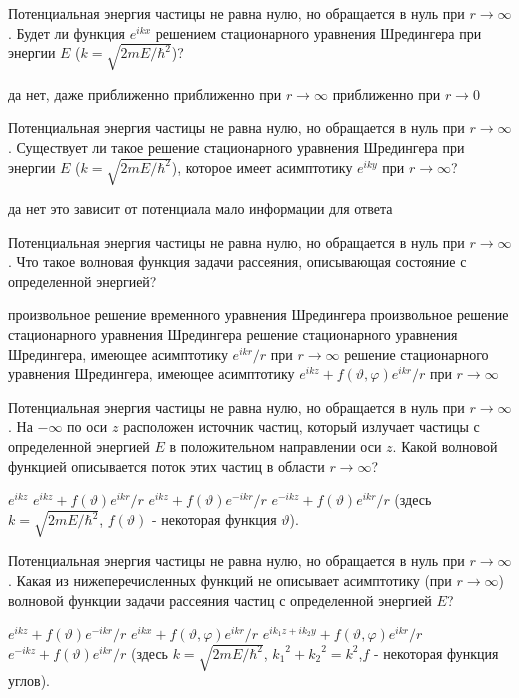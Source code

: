 \documentclass[11pt,a4paper]{exam}
\begin{document}
\begin{questions}
\question Потенциальная энергия частицы не равна нулю, но обращается в нуль при $r \to \infty $. Будет ли функция ${e^{ikx}}$ решением стационарного уравнения Шредингера при энергии $E$ ($k = \sqrt {2mE/{\hbar ^2}} $)?
\begin{choices}
\choice да             
\choice нет, даже приближенно
\choice приближенно при $r \to \infty $     
\choice приближенно при $r \to 0$
\end{choices}

\question Потенциальная энергия частицы не равна нулю, но обращается в нуль при $r \to \infty $. Существует ли такое решение стационарного уравнения Шредингера при энергии $E$ ($k = \sqrt {2mE/{\hbar ^2}} $), которое имеет асимптотику ${e^{iky}}$ при $r \to \infty $?
\begin{choices}
\choice да
\choice нет
\choice это зависит от потенциала
\choice мало информации для ответа
\end{choices}

\question Потенциальная энергия частицы не равна нулю, но обращается в нуль при $r \to \infty $. Что такое волновая функция задачи рассеяния, описывающая состояние с определенной энергией?
\begin{choices}
\choice произвольное решение временного уравнения Шредингера
\choice произвольное решение стационарного уравнения Шредингера
\choice решение стационарного уравнения Шредингера, имеющее асимптотику ${e^{ikr}}/r$ при $r \to \infty $
\choice решение стационарного уравнения Шредингера, имеющее асимптотику ${e^{ikz}} + f(\vartheta ,\varphi ){e^{ikr}}/r$ при $r \to \infty $
\end{choices}

\question Потенциальная энергия частицы не равна нулю, но обращается в нуль при $r \to \infty $. На $ - \infty $ по оси $z$ расположен источник частиц, который излучает частицы с определенной энергией $E$ в положительном направлении оси $z$. Какой волновой функцией описывается поток этих частиц в области $r \to \infty $?
\begin{choices}
\choice ${e^{ikz}}$    
\choice ${e^{ikz}} + f(\vartheta ){e^{ikr}}/r$    
\choice ${e^{ikz}} + f(\vartheta ){e^{ - ikr}}/r$    
\choice ${e^{ - ikz}} + f(\vartheta ){e^{ikr}}/r$
(здесь $k = \sqrt {2mE/{\hbar ^2}} $, $f(\vartheta )$ - некоторая функция $\vartheta $).
\end{choices}

\question Потенциальная энергия частицы не равна нулю, но обращается в нуль при $r \to \infty $. Какая из нижеперечисленных функций не описывает асимптотику (при $r \to \infty $) волновой функции задачи рассеяния частиц с определенной энергией $E$?
\begin{choices}
\choice ${e^{ikz}} + f(\vartheta ){e^{ - ikr}}/r$       
\choice ${e^{ikx}} + f(\vartheta ,\varphi ){e^{ikr}}/r$
\choice ${e^{i{k_1}z + i{k_2}y}} + f(\vartheta ,\varphi ){e^{ikr}}/r$     
\choice ${e^{ - ikz}} + f(\vartheta ){e^{ikr}}/r$
(здесь $k = \sqrt {2mE/{\hbar ^2}} $, ${k_1}^2 + {k_2}^2 = {k^2}$,$f$ - некоторая функция углов).
\end{choices}


\end{questions}
\end{document}
